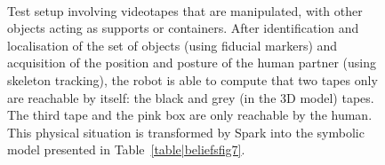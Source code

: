 \documentclass[preprint,3p,times]{elsarticle}
\begin{document}
\begin{figure}[ht!]
   \begin{center}
%
       \\ %
%
   \end{center}

   \caption{Test setup involving videotapes that are manipulated, with other
       objects acting as supports or containers. After identification and
       localisation of the set of objects (using fiducial markers) and
       acquisition of the position and posture of the human partner (using
       skeleton tracking), the robot is able to compute that two tapes only are
       reachable by itself: the black and grey (in the 3D model) tapes.  The
       third tape and the pink box are only reachable by the human. This
       physical situation is transformed by {\sc Spark} into the symbolic model
       presented in Table~\ref{table|beliefsfig7}.  }%
        
 \label{fig:sparkSubfigures}

\end{figure}
\end{document}
